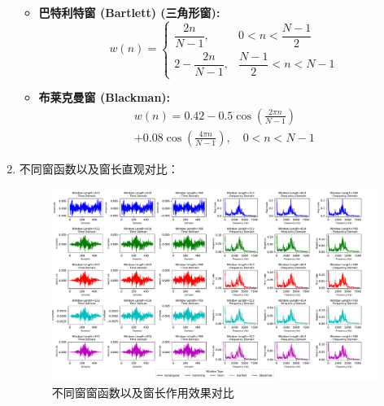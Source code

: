 \documentclass[a4paper]{article}
\begin{document}
\begin{enumerate}
{\begin{itemize}
      \item \textbf{巴特利特窗 (Bartlett) (三角形窗):}
      \begin{equation}
        w(n) = 
        \begin{cases} 
        \dfrac{2n}{N-1}, & 0 < n < \dfrac{N-1}{2} \\
        2 - \dfrac{2n}{N-1}, & \dfrac{N-1}{2} < n < N-1 
        \end{cases}
        \label{eq:Bartlett}
      \end{equation}

      \item \textbf{布莱克曼窗 (Blackman):}
      \begin{equation}
        \begin{split}
          w(n) = 0.42 - 0.5 \cos\left( \frac{2\pi n}{N-1} \right)\\
           + 0.08 \cos\left( \frac{4\pi n}{N-1} \right), \quad 0 < n < N-1
        \end{split}
      \end{equation}

  \end{itemize}
  }
  \item 
  {
    不同窗函数以及窗长直观对比：
    \begin{figure}[h]
      \centering
      \includegraphics[width=\textwidth]{figs/counting_on_windows.pdf}
      \caption{不同窗窗函数以及窗长作用效果对比}
      \label{fig:counting_on_windows}
    \end{figure}

}
\end{enumerate}
\end{document}

